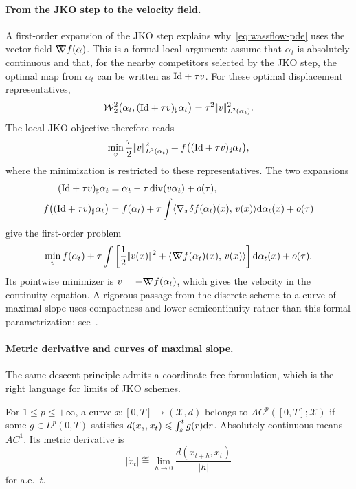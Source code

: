 \paragraph{From the JKO step to the velocity field.}

A first-order expansion of the JKO step explains why~\eqref{eq:wassflow-pde} uses the vector field $\mathord{\nabla\mkern-9.3mu\nabla} f(\alpha)$. This is a formal local argument: assume that $\alpha_t$ is absolutely continuous and that, for the nearby competitors selected by the JKO step, the optimal map from $\alpha_t$ can be written as $\mathrm{Id}+\tau v$. For these optimal displacement representatives,
	\[
		\operatorname{\mathcal{W}}_2^2\bigl(\alpha_t,(\mathrm{Id}+\tau v)_\sharp\alpha_t\bigr)
		=
		\tau^2|\!| v |\!|_{L^2(\alpha_t)}^2.
	\]
The local JKO objective therefore reads
	\[
		\min_v \frac{\tau}{2}|\!| v |\!|_{L^2(\alpha_t)}^2
		+f\bigl((\mathrm{Id}+\tau v)_\sharp\alpha_t\bigr),
	\]
where the minimization is restricted to these representatives. The two expansions
	\begin{align*}
		(\mathrm{Id}+\tau v)_\sharp\alpha_t
		&=
		\alpha_t-\tau\operatorname{div}(v\alpha_t)+o(\tau),\\
		f\bigl((\mathrm{Id}+\tau v)_\sharp\alpha_t\bigr)
		&=
		f(\alpha_t)
		+\tau\int\langle \nabla_x\delta f(\alpha_t)(x),\,v(x)\rangle\mathrm{d}\alpha_t(x)
		+o(\tau)
	\end{align*}
give the first-order problem
	\[
		\min_v f(\alpha_t)
		+\tau\int\left[
			\frac12|\!| v(x) |\!|^2
			+\langle \mathord{\nabla\mkern-9.3mu\nabla} f(\alpha_t)(x),\,v(x)\rangle
		\right]\mathrm{d}\alpha_t(x)
		+o(\tau).
	\]
Its pointwise minimizer is $v=-\mathord{\nabla\mkern-9.3mu\nabla} f(\alpha_t)$, which gives the velocity in the continuity equation. A rigorous passage from the discrete scheme to a curve of maximal slope uses compactness and lower-semicontinuity rather than this formal parametrization; see~\cite{JDB-JKO,ambrosio2006gradient}.

\paragraph{Metric derivative and curves of maximal slope.}

The same descent principle admits a coordinate-free formulation, which is the right language for limits of JKO schemes.
\begin{defn}\label{def-metric-derivative-ac-curve}
For \(1\leq p\leq+\infty\), a curve $x:[0,T]\to(\mathcal X,d)$ belongs to \(AC^p([0,T];\mathcal X)\) if some $g\in L^p(0,T)$ satisfies $d(x_s,x_t)\leqslant\int_s^t g(r)\mathrm{d} r$. Absolutely continuous means \(AC^1\). Its metric derivative is
		\[
		|\dot x_t|
		\eqdef
			\lim_{h\to 0}\frac{d(x_{t+h},x_t)}{|h|}
		\]
for a.e.\ $t$.
\end{defn}

